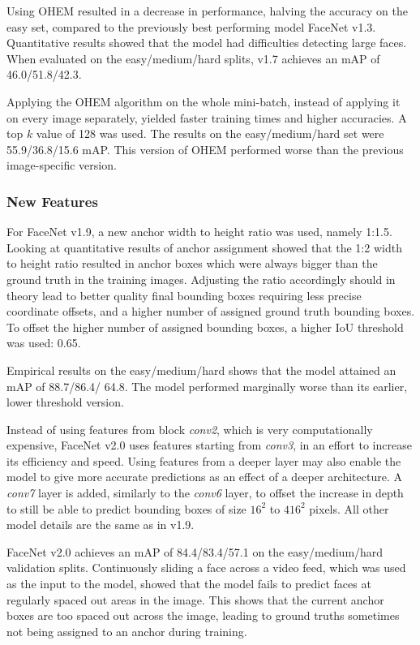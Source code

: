 \documentclass[a4paper, twoside]{article}
\begin{document}
Using OHEM resulted in a decrease in performance, halving the accuracy on the easy set, compared to the previously best performing model FaceNet v1.3. Quantitative results showed that the model had difficulties detecting large faces. When evaluated on the easy/medium/hard splits, v1.7 achieves an mAP of 46.0/51.8/42.3.

Applying the OHEM algorithm on the whole mini-batch, instead of applying it on every image separately, yielded faster training times and higher accuracies. A top $k$ value of 128 was used. The results on the easy/medium/hard set were 55.9/36.8/15.6 mAP. This version of OHEM performed worse than the previous image-specific version.

\subsubsection{New Features}
For FaceNet v1.9, a new anchor width to height ratio was used, namely 1:1.5. Looking at quantitative results of anchor assignment showed that the 1:2 width to height ratio resulted in anchor boxes which were always bigger than the ground truth in the training images. Adjusting the ratio accordingly should in theory lead to better quality final bounding boxes requiring less precise coordinate offsets, and a higher number of assigned ground truth bounding boxes. To offset the higher number of assigned bounding boxes, a higher IoU threshold was used: 0.65.

Empirical results on the easy/medium/hard shows that the model attained an mAP of 88.7/86.4/ 64.8. The model performed marginally worse than its earlier, lower threshold version.

Instead of using features from block \textit{conv2}, which is very computationally expensive, FaceNet v2.0 uses features starting from \textit{conv3}, in an effort to increase its efficiency and speed. Using features from a deeper layer may also enable the model to give more accurate predictions as an effect of a deeper architecture. A \textit{conv7} layer is added, similarly to the \textit{conv6} layer, to offset the increase in depth to still be able to predict bounding boxes of size $16^2$ to $416^2$ pixels. All other model details are the same as in v1.9.

FaceNet v2.0 achieves an mAP of 84.4/83.4/57.1 on the easy/medium/hard validation splits. Continuously sliding a face across a video feed, which was used as the input to the model, showed that the model fails to predict faces at regularly spaced out areas in the image. This shows that the current anchor boxes are too spaced out across the image, leading to ground truths sometimes not being assigned to an anchor during training.
\end{document}
